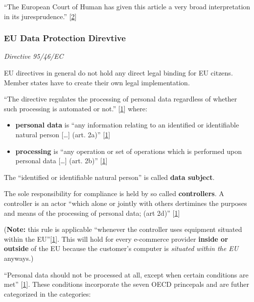 ``The European Court of Human has given this article a very broad
interpretation in its juresprudence.'' {[}\hyperref[references]{2}{]}

\subsubsection{EU Data Protection Direvtive}

\emph{Directive 95/46/EC}

EU directives in general do not hold any direct legal binding for EU
citzens. Member states have to create their own legal implementation.

``The directive regulates the processing of personal data regardless of
whether such processing is automated or not.''
{[}\hyperref[references]{1}{]} where:

\begin{itemize}
\itemsep1pt\parskip0pt
\item
  \textbf{personal data} is ``any information relating to an identified
  or identifiable natural person {[}\ldots{}{]} (art. 2a)''
  {[}\hyperref[references]{1}{]}
\item
  \textbf{processing} is ``any operation or set of operations which is
  performed upon personal data {[}\ldots{}{]} (art. 2b)''
  {[}\hyperref[references]{1}{]}
\end{itemize}

The ``identified or identifiable natural person'' is called \textbf{data
subject}.

The sole responsibility for compliance is held by so called
\textbf{controllers}. A controller is an actor ``which alone or jointly
with others dertimines the purposes and means of the processing of
personal data; (art 2d)'' {[}\hyperref[references]{1}{]}

(\textbf{Note:} this rule is applicable ``whenever the controller uses
equipment situated within the EU''{[}\hyperref[references]{1}{]}. This
will hold for every e-commerce provider \textbf{inside or outside} of
the EU because the customer's computer is \emph{situated within the EU}
anyways.)

``Personal data should not be processed at all, except when certain
conditions are met'' {[}\hyperref[references]{1}{]}. These conditions
incorporate the seven OECD princepals and are futher categorized in the
categories:

